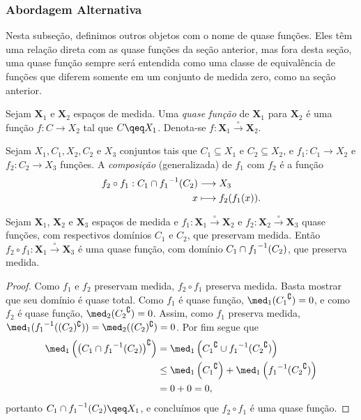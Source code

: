 \subsubsection{Abordagem Alternativa}

Nesta subseção, definimos outros objetos com o nome de quase funções. Eles têm uma relação direta com as quase funções da seção anterior, mas fora desta seção, uma quase função sempre será entendida como uma classe de equivalência de funções que diferem somente em um conjunto de medida zero, como na seção anterior.

\begin{defi}
Sejam $\bm X_1$ e $\bm X_2$ espaços de medida. Uma \emph{quase função} de $\bm X_1$ para $\bm X_2$ é uma função $f\colon C \to X_2$ tal que $C \qeq X_1$. Denota-se $f\colon \bm X_1 \overset{\circ}{\to} \bm X_2$.
\end{defi}

\begin{defi}
Sejam $X_1,C_1,X_2,C_2$ e $X_3$ conjuntos tais que $C_1 \subseteq X_1$ e $C_2 \subseteq X_2$, e $f_1\colon C_1 \to X_2$ e $f_2\colon C_2 \to X_3$ funções. A \emph{composição} (generalizada) de $f_1$ com $f_2$ é a função
	\begin{align*}
	{f_2 \circ f_1}: {C_1 \cap {f_1}^{-1}(C_2)} &\longrightarrow {X_3} \\{x} &\longmapsto {f_2(f_1(x))}.
	\end{align*}
\end{defi}

\begin{prop}
Sejam $\bm X_1$, $\bm X_2$ e $\bm X_3$ espaços de medida e $f_1\colon \bm X_1 \overset{\circ}{\to} \bm X_2$ e $f_2\colon \bm X_2 \overset{\circ}{\to} \bm X_3$ quase funções, com respectivos domínios $C_1$ e $C_2$, que preservam medida. Então $f_2 \circ f_1\colon \bm X_1 \overset{\circ}{\to} \bm X_3$ é uma quase função, com domínio $C_1 \cap {f_1}^{-1}(C_2)$, que preserva medida.
\end{prop}
\begin{proof}
Como $f_1$ e $f_2$ preservam medida, $f_2 \circ f_1$ preserva medida. Basta mostrar que seu domínio é quase total. Como $f_1$ é quase função, $\med_1({C_1}^\complement) = 0$, e como $f_2$ é quase função, $\med_2({C_2}^\complement) = 0$. Assim, como $f_1$ preserva medida, $\med_1({f_1}\inv((C_2)^\complement)) = \med_2((C_2)^\complement)= 0$. Por fim segue que
	\begin{align*}
	\med_1 \left(\left(C_1 \cap {f_1}\inv(C_2)\right)^\complement\right) &= \med_1 \left({C_1}^\complement \cup {f_1}\inv({C_2}^\complement)\right) \\
		&\leq \med_1 \left({C_1}^\complement\right ) + \med_1 \left ({f_1}\inv({C_2}^\complement)\right) \\
		&= 0+0=0,
	\end{align*}
portanto $C_1 \cap {f_1}\inv(C_2) \qeq X_1$, e concluímos que $f_2 \circ f_1$ é uma quase função.
\end{proof}

